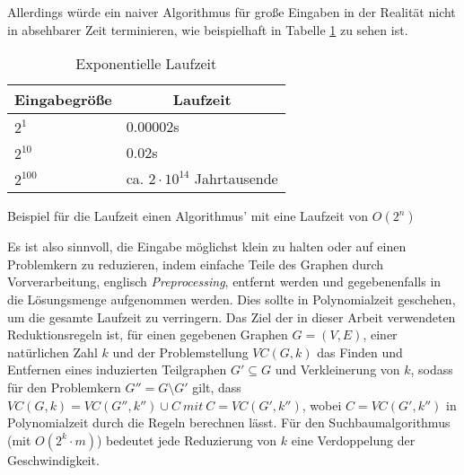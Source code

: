  Allerdings würde ein naiver Algorithmus für große Eingaben in der Realität nicht in absehbarer Zeit terminieren, wie beispielhaft in Tabelle \ref{tab:exponential} zu sehen ist.
 \begin{table}[htb]
\caption{Exponentielle Laufzeit \label{tab:exponential}}
\vspace*{1em}
\centering

\bgroup
\def\arraystretch{1.3}%

\begin{threeparttable}

\begin{tabular}[c]{l l}
	\hline
	\multicolumn{1}{c}{\textbf{Eingabegröße}} & 
	\multicolumn{1}{c}{\textbf{Laufzeit}} \\ 
	
	\hline

	$2^{1}$& 0.00002s\\
	$2^{10}$& 0.02s\\
	$2^{100}$& ca. $ 2 \cdot 10^{14} $ Jahrtausende \\
	\hline
\end{tabular}

\begin{tablenotes}\footnotesize
\item Beispiel für die Laufzeit einen Algorithmus' mit eine Laufzeit von $O(2^{n})$
\end{tablenotes}

\end{threeparttable}

\egroup

\end{table}
Es ist also sinnvoll, die Eingabe möglichst klein zu halten oder auf einen Problemkern zu reduzieren, indem einfache Teile des Graphen durch Vorverarbeitung, englisch \emph{Preprocessing}, entfernt werden und gegebenenfalls in die Lösungsmenge aufgenommen werden. Dies sollte in Polynomialzeit geschehen, um die gesamte Laufzeit zu verringern. Das Ziel der in dieser Arbeit verwendeten Reduktionsregeln ist, für einen gegebenen Graphen $G=(V,E)$, einer natürlichen Zahl $k$ und der Problemstellung $VC(G,k)$ das Finden und Entfernen eines induzierten Teilgraphen $G' \subseteq G$ und Verkleinerung von $k$,
sodass für den Problemkern $G'' = G \setminus G'$ gilt, dass $VC(G,k) = VC(G'',k'') \cup C\ mit\ C=VC(G', k'')$, wobei $C=VC(G', k'')$ in Polynomialzeit durch die Regeln berechnen lässt. Für den Suchbaumalgorithmus (mit $O(2^{k} \cdot m)$) bedeutet jede Reduzierung von $k$ eine Verdoppelung der Geschwindigkeit. 


